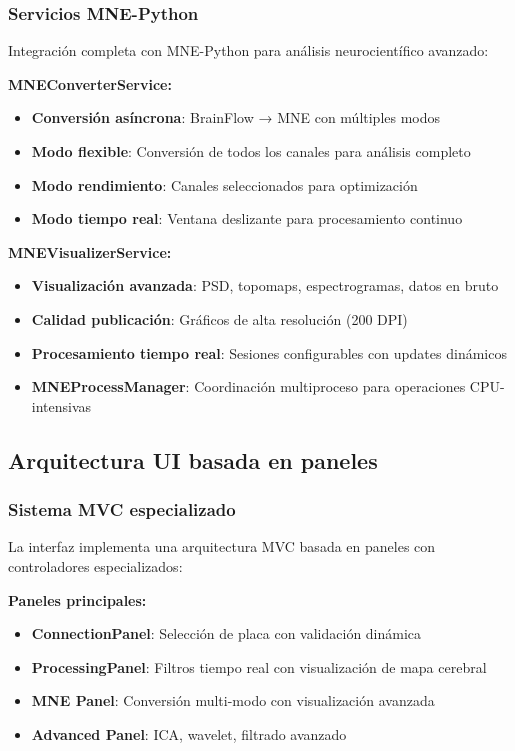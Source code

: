 \subsubsection{Servicios MNE-Python}

Integración completa con MNE-Python para análisis neurocientífico avanzado:

\textbf{MNEConverterService:}
\begin{itemize}
    \item \textbf{Conversión asíncrona}: BrainFlow → MNE con múltiples modos
    \item \textbf{Modo flexible}: Conversión de todos los canales para análisis completo
    \item \textbf{Modo rendimiento}: Canales seleccionados para optimización
    \item \textbf{Modo tiempo real}: Ventana deslizante para procesamiento continuo
\end{itemize}

\textbf{MNEVisualizerService:}
\begin{itemize}
    \item \textbf{Visualización avanzada}: PSD, topomaps, espectrogramas, datos en bruto
    \item \textbf{Calidad publicación}: Gráficos de alta resolución (200 DPI)
    \item \textbf{Procesamiento tiempo real}: Sesiones configurables con updates dinámicos
    \item \textbf{MNEProcessManager}: Coordinación multiproceso para operaciones CPU-intensivas
\end{itemize}

\subsection{Arquitectura UI basada en paneles}
\label{subsec:arquitectura_ui_eeg}

\subsubsection{Sistema MVC especializado}

La interfaz implementa una arquitectura MVC basada en paneles con controladores especializados:

\textbf{Paneles principales:}
\begin{itemize}
    \item \textbf{ConnectionPanel}: Selección de placa con validación dinámica
    \item \textbf{ProcessingPanel}: Filtros tiempo real con visualización de mapa cerebral
    \item \textbf{MNE Panel}: Conversión multi-modo con visualización avanzada
    \item \textbf{Advanced Panel}: ICA, wavelet, filtrado avanzado
\end{itemize}

